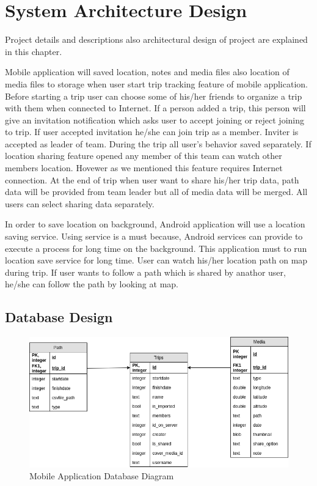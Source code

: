 \chapter{System Architecture Design}

Project details and descriptions also architectural design of project are explained in this chapter.

Mobile application will saved location, notes and media files also location of media files to storage when user start trip tracking feature of mobile application. Before starting a trip user can choose some of his/her friends to organize a trip with them when connected to Internet. If a person added a trip, this person will give an invitation notification which asks user to accept joining or reject joining to trip. If user accepted invitation he/she can join trip as a member. Inviter is accepted as leader of team. During the trip all user's behavior saved separately. If location sharing feature opened any member of this team can watch other members location. Hovewer as we mentioned this feature requires Internet connection. At the end of trip when user want to share his/her trip data, path data will be provided from team leader but all of media data will be merged. All users can select sharing data separately.

In order to save location on background, Android application will use a location saving service. Using service is a must because, Android services can provide to execute a process for long time on the background. This application must to run location save service for long time. User can watch his/her location path on map during trip. If user wants to follow a path which is shared by anathor user, he/she can follow the path by looking at map.

\newpage
\section{Database Design}
\begin{figure}[!htbp]
\centering
\includegraphics[width=\textwidth]{projectChapters/images/android_database.png}
\caption{Mobile Application Database Diagram}
\label{fig:roles}
\end{figure}

